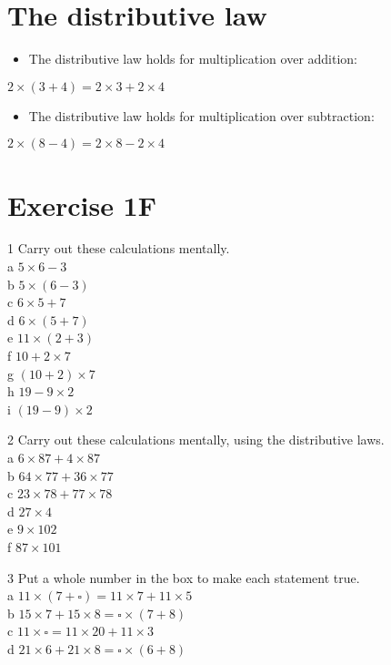 \documentclass[10pt]{article}
\begin{document}
\section*{The distributive law}
\begin{itemize}
  \item The distributive law holds for multiplication over addition:
\end{itemize}

\(2 \times(3+4)=2 \times 3+2 \times 4\)

\begin{itemize}
  \item The distributive law holds for multiplication over subtraction:
\end{itemize}

\(2 \times(8-4)=2 \times 8-2 \times 4\)

\section*{Exercise 1F}
1 Carry out these calculations mentally.\\
a \(5 \times 6-3\)\\
b \(5 \times(6-3)\)\\
c \(6 \times 5+7\)\\
d \(6 \times(5+7)\)\\
e \(11 \times(2+3)\)\\
f \(10+2 \times 7\)\\
g \((10+2) \times 7\)\\
h \(19-9 \times 2\)\\
i \((19-9) \times 2\)

2 Carry out these calculations mentally, using the distributive laws.\\
a \(6 \times 87+4 \times 87\)\\
b \(64 \times 77+36 \times 77\)\\
c \(23 \times 78+77 \times 78\)\\
d \(27 \times 4\)\\
e \(9 \times 102\)\\
f \(87 \times 101\)

3 Put a whole number in the box to make each statement true.\\
a \(11 \times(7+\square)=11 \times 7+11 \times 5\)\\
b \(15 \times 7+15 \times 8=\square \times(7+8)\)\\
c \(11 \times \square=11 \times 20+11 \times 3\)\\
d \(21 \times 6+21 \times 8=\square \times(6+8)\)
\end{document}
